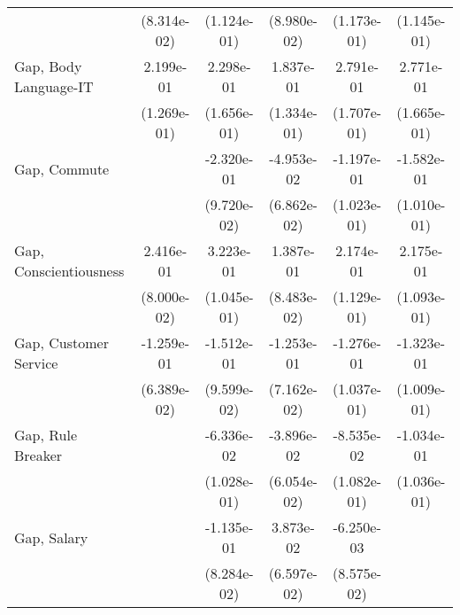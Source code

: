 {\begin{tabular}{l*{5}{c}}
                             & (8.314e-02)           & (1.124e-01)           & (8.980e-02)           & (1.173e-01)           & (1.145e-01)                 \\
    \addlinespace
    Gap, Body Language-IT    & 2.199e-01\sym{+}      & 2.298e-01             & 1.837e-01             & 2.791e-01             & 2.771e-01\sym{+}            \\
                             & (1.269e-01)           & (1.656e-01)           & (1.334e-01)           & (1.707e-01)           & (1.665e-01)                 \\
    \addlinespace
    Gap, Commute             &                       & -2.320e-01\sym{++}    & -4.953e-02            & -1.197e-01            & -1.582e-01                  \\
                             &                       & (9.720e-02)           & (6.862e-02)           & (1.023e-01)           & (1.010e-01)                 \\
    \addlinespace
    Gap, Conscientiousness   & 2.416e-01\sym{*}      & 3.223e-01\sym{*}      & 1.387e-01             & 2.174e-01\sym{+}      & 2.175e-01\sym{++}           \\
                             & (8.000e-02)           & (1.045e-01)           & (8.483e-02)           & (1.129e-01)           & (1.093e-01)                 \\
    \addlinespace
    Gap, Customer Service    & -1.259e-01\sym{+}     & -1.512e-01            & -1.253e-01\sym{+}     & -1.276e-01            & -1.323e-01                  \\
                             & (6.389e-02)           & (9.599e-02)           & (7.162e-02)           & (1.037e-01)           & (1.009e-01)                 \\
    \addlinespace
    Gap, Rule Breaker        &                       & -6.336e-02            & -3.896e-02            & -8.535e-02            & -1.034e-01                  \\
                             &                       & (1.028e-01)           & (6.054e-02)           & (1.082e-01)           & (1.036e-01)                 \\
    \addlinespace
    Gap, Salary              &                       & -1.135e-01            & 3.873e-02             & -6.250e-03            &                             \\
                             &                       & (8.284e-02)           & (6.597e-02)           & (8.575e-02)           &                             \\

\end{tabular}}

